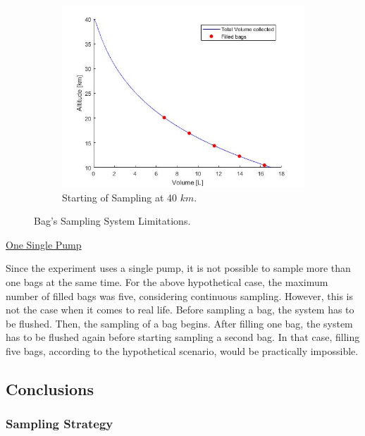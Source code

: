 \begin{figure}[H]
\begin{subfigure}{0.45\textwidth}
    \centering\includegraphics[width=1.2\textwidth]{appendix/img/samplevolume40km.png}
    \caption{Starting of Sampling at 40 $km$.}
  \end{subfigure}
  \caption{Bag's Sampling System Limitations.}\label{fig:limits}
\end{figure}
 

\bigskip
\underline{One Single Pump}

\smallskip
Since the experiment uses a single pump, it is not possible to sample more than one bags at the same time. For the above hypothetical case, the maximum number of filled bags was five, considering continuous sampling. However, this is not the case when it comes to real life. Before sampling a bag, the system has to be flushed. Then, the sampling of a bag begins. After filling one bag, the system has to be flushed again before starting sampling a second bag. In that case, filling five bags, according to the hypothetical scenario, would be practically impossible.


\newpage
\subsection{Conclusions}

\subsubsection{Sampling Strategy}

